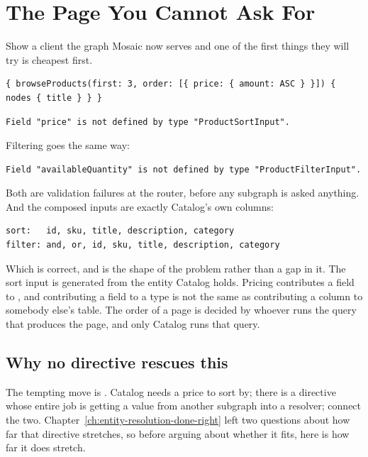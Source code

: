 \section{The Page You Cannot Ask For}
\label{sec:ch13-the-page-you-cannot-ask-for}
%

Show a client the graph Mosaic now serves and one of the first things they will
try is cheapest first.

\begin{verbatim}
{ browseProducts(first: 3, order: [{ price: { amount: ASC } }]) { nodes { title } } }
\end{verbatim}

\begin{verbatim}
Field "price" is not defined by type "ProductSortInput".
\end{verbatim}

Filtering goes the same way:

\begin{verbatim}
Field "availableQuantity" is not defined by type "ProductFilterInput".
\end{verbatim}

Both are validation failures at the router, before any subgraph is asked
anything. And the composed inputs are exactly Catalog's own columns:

\begin{verbatim}
sort:   id, sku, title, description, category
filter: and, or, id, sku, title, description, category
\end{verbatim}

%
Which is correct, and is the shape of the problem rather than a gap in it. The
sort input is generated from the entity Catalog holds. Pricing contributes a
field to , and contributing a field to a type is not the same as
contributing a column to somebody else's table. The order of a page is decided
by whoever runs the query that produces the page, and only Catalog runs that
query.

\subsection*{Why no directive rescues this}

%
The tempting move is . Catalog needs a price to sort by; there is
a directive whose entire job is getting a value from another subgraph into a
resolver; connect the two. Chapter~\ref{ch:entity-resolution-done-right} left two
questions about how far that directive stretches, so before arguing about
whether it fits, here is how far it does stretch.

